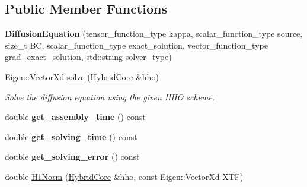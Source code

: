 \subsection*{Public Member Functions}
\begin{DoxyCompactItemize}
\item 
\mbox{\label{classMeshFramework2D_1_1DiffusionEquation_af5bb309109c87e616f986db1ab5fc7e5}} 
{\bfseries Diffusion\+Equation} (tensor\+\_\+function\+\_\+type kappa, scalar\+\_\+function\+\_\+type source, size\+\_\+t BC, scalar\+\_\+function\+\_\+type exact\+\_\+solution, vector\+\_\+function\+\_\+type grad\+\_\+exact\+\_\+solution, std\+::string solver\+\_\+type)
\item 
\mbox{\label{classMeshFramework2D_1_1DiffusionEquation_a434ab2f70f349932900cc7017507cf2f}} 
Eigen\+::\+Vector\+Xd \hyperlink{classMeshFramework2D_1_1DiffusionEquation_a434ab2f70f349932900cc7017507cf2f}{solve} (\hyperlink{classMeshFramework2D_1_1HybridCore}{Hybrid\+Core} \&hho)
\begin{DoxyCompactList}\small\item\em Solve the diffusion equation using the given H\+HO scheme. \end{DoxyCompactList}\item 
\mbox{\label{classMeshFramework2D_1_1DiffusionEquation_aacb065cb7af81024ab2a031e69d4d594}} 
double {\bfseries get\+\_\+assembly\+\_\+time} () const
\item 
\mbox{\label{classMeshFramework2D_1_1DiffusionEquation_a243e0bed79019df387b59584205b8ea9}} 
double {\bfseries get\+\_\+solving\+\_\+time} () const
\item 
\mbox{\label{classMeshFramework2D_1_1DiffusionEquation_ad4d8c0ad2a161687b11cdd03004a43de}} 
double {\bfseries get\+\_\+solving\+\_\+error} () const
\item 
\mbox{\label{classMeshFramework2D_1_1DiffusionEquation_a13faf2c5b7e245791a59b0128ce4fbb7}} 
double \hyperlink{classMeshFramework2D_1_1DiffusionEquation_a13faf2c5b7e245791a59b0128ce4fbb7}{H1\+Norm} (\hyperlink{classMeshFramework2D_1_1HybridCore}{Hybrid\+Core} \&hho, const Eigen\+::\+Vector\+Xd X\+TF)

\end{DoxyCompactItemize}
